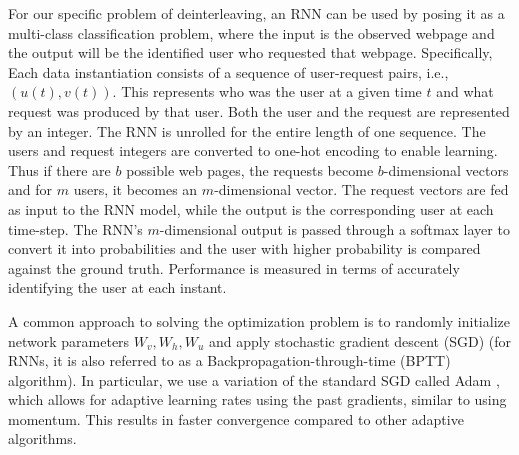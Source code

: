 	
	For our specific problem of deinterleaving, an RNN can be used by posing it as a multi-class classification problem, where the input is the observed webpage and the output will be the identified user who requested that webpage. Specifically, Each data instantiation consists of a sequence of user-request pairs, i.e., $(u(t), v(t))$. 
	This represents who was the user at a given time $t$ and what request was produced by that user. Both the user and the request are represented by an integer. The RNN is unrolled for the entire length of one sequence. The users and request integers are converted to one-hot encoding to enable learning. Thus if there are $b$ possible web pages, the requests become $b$-dimensional vectors and for $m$ users, it becomes an $m$-dimensional vector. The request vectors are fed as input to the RNN model, while the output is the corresponding user at each time-step. The RNN’s $m$-dimensional output is passed through a softmax layer to convert it into probabilities and the user with higher probability is compared against the ground truth. Performance is measured in terms of accurately identifying the user at each instant.
	
	A common approach to solving the optimization problem is to randomly initialize network parameters $W_v, W_h, W_u$ and apply stochastic gradient descent (SGD) (for RNNs, it is also referred to as a Backpropagation-through-time (BPTT) algorithm). In particular, we use a variation of the standard SGD called Adam \cite{kingma2014adam}, which allows for adaptive learning rates using the past gradients, similar to using momentum. This results in faster convergence compared to other adaptive algorithms.
	
	
	